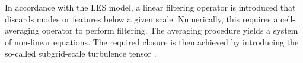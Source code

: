 
In accordance with the \ac{LES} model, a linear filtering operator 
is introduced that discards modes or features below a given scale. 
Numerically, this requires a cell-averaging operator to perform filtering.
%
%
%
%
%
The averaging procedure 
yields a 
system of non-linear equations. 
%
%
%
The required closure is then achieved by introducing the 
so-called subgrid-scale turbulence tensor \citep{Radice:2017zta}. 


